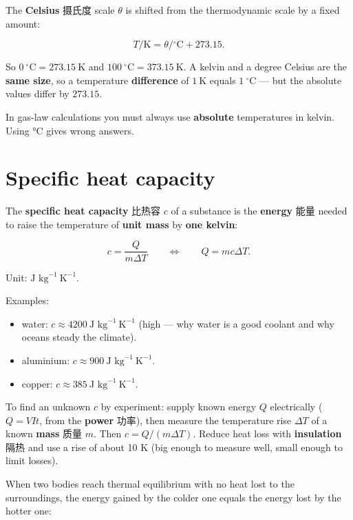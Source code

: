 \documentclass[11pt]{article}
\begin{document}
The \textbf{Celsius} 摄氏度 scale $\theta$ is shifted from the thermodynamic scale by a fixed amount:

\[
T / \text{K} = \theta / {}^{\circ}\text{C} + 273.15.
\]

So $0\ ^{\circ}\text{C} = 273.15\ \text{K}$ and $100\ ^{\circ}\text{C} = 373.15\ \text{K}$. A kelvin and a degree Celsius are the \textbf{same size}, so a temperature \textbf{difference} of $1\ \text{K}$ equals $1\ ^{\circ}\text{C}$ — but the absolute values differ by $273.15$.

In gas-law calculations you must always use \textbf{absolute} temperatures in kelvin. Using °C gives wrong answers.

\section*{Specific heat capacity}

The \textbf{specific heat capacity} 比热容 $c$ of a substance is the \textbf{energy} 能量 needed to raise the temperature of \textbf{unit mass} by \textbf{one kelvin}:

\[
c = \frac{Q}{m \Delta T} \qquad\Longleftrightarrow\qquad Q = m c \Delta T.
\]

Unit: $\text{J kg}^{-1}\ \text{K}^{-1}$.

Examples:

\begin{itemize}
\item water: $c \approx 4200\ \text{J kg}^{-1}\ \text{K}^{-1}$ (high — why water is a good coolant and why oceans steady the climate).

\item aluminium: $c \approx 900\ \text{J kg}^{-1}\ \text{K}^{-1}$.

\item copper: $c \approx 385\ \text{J kg}^{-1}\ \text{K}^{-1}$.

\end{itemize}

To find an unknown $c$ by experiment: supply known energy $Q$ electrically ($Q = VIt$, from the \textbf{power} 功率), then measure the temperature rise $\Delta T$ of a known \textbf{mass} 质量 $m$. Then $c = Q/(m\Delta T)$. Reduce heat loss with \textbf{insulation} 隔热 and use a rise of about 10 K (big enough to measure well, small enough to limit losses).

When two bodies reach thermal equilibrium with no heat lost to the surroundings, the energy gained by the colder one equals the energy lost by the hotter one:
\end{document}
